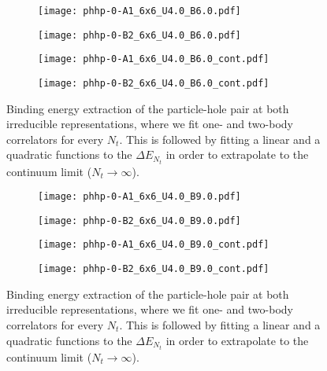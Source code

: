 \begin{figure}
  \begin{subfigure}{.5\textwidth}
    \centering
    \texttt{[image: phhp-0-A1\_6x6\_U4.0\_B6.0.pdf]}
  \end{subfigure}%
  \begin{subfigure}{.5\textwidth}
    \centering
    \texttt{[image: phhp-0-B2\_6x6\_U4.0\_B6.0.pdf]}
  \end{subfigure}
  \begin{subfigure}{.5\textwidth}
      \centering
      \texttt{[image: phhp-0-A1\_6x6\_U4.0\_B6.0\_cont.pdf]}
  \end{subfigure}
  \begin{subfigure}{.5\textwidth}
      \centering
      \texttt{[image: phhp-0-B2\_6x6\_U4.0\_B6.0\_cont.pdf]}
  \end{subfigure}
  \caption{Binding energy extraction of the particle-hole pair at both irreducible representations, where we fit one- and two-body correlators for every $N_t$. This is followed by fitting a linear and a quadratic functions to the $\Delta E_{N_t}$ in order to extrapolate to the continuum limit ($N_t\to\infty$).}
  \label{fig:fig15}
\end{figure}

\begin{figure}
  \begin{subfigure}{.5\textwidth}
    \centering
    \texttt{[image: phhp-0-A1\_6x6\_U4.0\_B9.0.pdf]}
  \end{subfigure}%
  \begin{subfigure}{.5\textwidth}
    \centering
    \texttt{[image: phhp-0-B2\_6x6\_U4.0\_B9.0.pdf]}
  \end{subfigure}
  \begin{subfigure}{.5\textwidth}
      \centering
      \texttt{[image: phhp-0-A1\_6x6\_U4.0\_B9.0\_cont.pdf]}
  \end{subfigure}
  \begin{subfigure}{.5\textwidth}
      \centering
      \texttt{[image: phhp-0-B2\_6x6\_U4.0\_B9.0\_cont.pdf]}
  \end{subfigure}
  \caption{Binding energy extraction of the particle-hole pair at both irreducible representations, where we fit one- and two-body correlators for every $N_t$. This is followed by fitting a linear and a quadratic functions to the $\Delta E_{N_t}$ in order to extrapolate to the continuum limit ($N_t\to\infty$).}
  \label{fig:fig16}
\end{figure}

